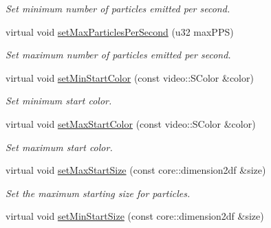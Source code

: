 \begin{DoxyCompactItemize}
\begin{DoxyCompactList}\small\item\em Set minimum number of particles emitted per second. \end{DoxyCompactList}\item 
\hypertarget{classirr_1_1scene_1_1_c_particle_box_emitter_a4c77db60df4298b0a82d52b5d408afa8}{virtual void \hyperlink{classirr_1_1scene_1_1_c_particle_box_emitter_a4c77db60df4298b0a82d52b5d408afa8}{set\-Max\-Particles\-Per\-Second} (u32 max\-P\-P\-S)}\label{classirr_1_1scene_1_1_c_particle_box_emitter_a4c77db60df4298b0a82d52b5d408afa8}

\begin{DoxyCompactList}\small\item\em Set maximum number of particles emitted per second. \end{DoxyCompactList}\item 
\hypertarget{classirr_1_1scene_1_1_c_particle_box_emitter_aaafde396c0a4fd675ae99fa199754f42}{virtual void \hyperlink{classirr_1_1scene_1_1_c_particle_box_emitter_aaafde396c0a4fd675ae99fa199754f42}{set\-Min\-Start\-Color} (const video\-::\-S\-Color \&color)}\label{classirr_1_1scene_1_1_c_particle_box_emitter_aaafde396c0a4fd675ae99fa199754f42}

\begin{DoxyCompactList}\small\item\em Set minimum start color. \end{DoxyCompactList}\item 
\hypertarget{classirr_1_1scene_1_1_c_particle_box_emitter_a61980198d2c67fab7656638e10c4aaf4}{virtual void \hyperlink{classirr_1_1scene_1_1_c_particle_box_emitter_a61980198d2c67fab7656638e10c4aaf4}{set\-Max\-Start\-Color} (const video\-::\-S\-Color \&color)}\label{classirr_1_1scene_1_1_c_particle_box_emitter_a61980198d2c67fab7656638e10c4aaf4}

\begin{DoxyCompactList}\small\item\em Set maximum start color. \end{DoxyCompactList}\item 
\hypertarget{classirr_1_1scene_1_1_c_particle_box_emitter_ae7575d40ac22954b05d232613740cd1c}{virtual void \hyperlink{classirr_1_1scene_1_1_c_particle_box_emitter_ae7575d40ac22954b05d232613740cd1c}{set\-Max\-Start\-Size} (const core\-::dimension2df \&size)}\label{classirr_1_1scene_1_1_c_particle_box_emitter_ae7575d40ac22954b05d232613740cd1c}

\begin{DoxyCompactList}\small\item\em Set the maximum starting size for particles. \end{DoxyCompactList}\item 
\hypertarget{classirr_1_1scene_1_1_c_particle_box_emitter_acdb5220dd66fb5be8ab8180a49bd8b6a}{virtual void \hyperlink{classirr_1_1scene_1_1_c_particle_box_emitter_acdb5220dd66fb5be8ab8180a49bd8b6a}{set\-Min\-Start\-Size} (const core\-::dimension2df \&size)}\label{classirr_1_1scene_1_1_c_particle_box_emitter_acdb5220dd66fb5be8ab8180a49bd8b6a}


\end{DoxyCompactItemize}
